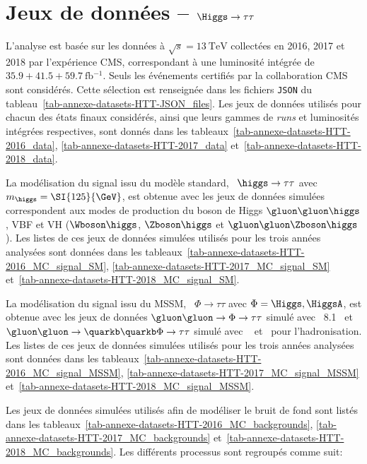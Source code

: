 \chapter{Jeux de données -- $\Higgs\to\tau\tau$}\label{annexe-datasets-HTT}
L'analyse est basée sur les données à $\sqrt{s}=\SI{13}{\TeV}$ collectées en 2016, 2017 et 2018 par l'expérience CMS, correspondant à une luminosité intégrée de $\num{35.9}+\num{41.5}+\SI{59.7}{\femto\barn^{-1}}$.
Seuls les événements certifiés par la collaboration CMS sont considérés. Cette sélection est renseignée dans les fichiers \texttt{JSON} du tableau~\ref{tab-annexe-datasets-HTT-JSON_files}.
Les jeux de données utilisés pour chacun des états finaux considérés, ainsi que leurs gammes de \emph{runs} et luminosités intégrées respectives, sont donnés dans les tableaux~\ref{tab-annexe-datasets-HTT-2016_data}, \ref{tab-annexe-datasets-HTT-2017_data} et~\ref{tab-annexe-datasets-HTT-2018_data}.
\par
La modélisation du signal issu du modèle standard,
\ie\ $\higgs\to\tau\tau$ avec $m_{\higgs}=\SI{125}{\GeV}$,
est obtenue avec les jeux de données simulées correspondent aux modes de production du boson de Higgs
$\gluon\gluon\higgs$,
VBF
et
VH ($\Wboson\higgs$, $\Zboson\higgs$ et $\gluon\gluon\Zboson\higgs$).
Les listes de ces jeux de données simulées utilisés pour les trois années analysées sont données dans les tableaux~\ref{tab-annexe-datasets-HTT-2016_MC_signal_SM}, \ref{tab-annexe-datasets-HTT-2017_MC_signal_SM} et~\ref{tab-annexe-datasets-HTT-2018_MC_signal_SM}.
\par
La modélisation du signal issu du MSSM,
\ie\ $\Phi\to\tau\tau$ avec $\Phi=\Higgs,\HiggsA$,
est obtenue avec les jeux de données
$\gluon\gluon\to\Phi\to\tau\tau$ simulé avec \PYTHIA~8.1~\cite{pythia8.1}
et
$\gluon\gluon\to\quarkb\quarkb\Phi\to\tau\tau$ simulé avec \AMCATNLO~\cite{amcatnlo} et \PYTHIA\ pour l'hadronisation.
Les listes de ces jeux de données simulées utilisés pour les trois années analysées sont données dans les tableaux~\ref{tab-annexe-datasets-HTT-2016_MC_signal_MSSM}, \ref{tab-annexe-datasets-HTT-2017_MC_signal_MSSM} et~\ref{tab-annexe-datasets-HTT-2018_MC_signal_MSSM}.
\par
Les jeux de données simulées utilisés afin de modéliser le bruit de fond sont listés dans les tableaux~\ref{tab-annexe-datasets-HTT-2016_MC_backgrounds}, \ref{tab-annexe-datasets-HTT-2017_MC_backgrounds} et~\ref{tab-annexe-datasets-HTT-2018_MC_backgrounds}.
Les différents processus sont regroupés comme suit:

\vspace{.5\baselineskip}

